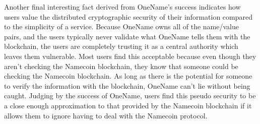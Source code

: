 Another final interesting fact derived from OneName's success indicates how users value the distributed cryptographic security of their information compared to the simplicity of a service. Because OneName owns all of the name/value pairs, and the users typically never validate what OneName tells them with the blockchain, the users are completely trusting it as a central authority which leaves them vulnerable. Most users find this acceptable because even though they aren't checking the Namecoin blockchain, they know that someone could be checking the Namecoin blockchain. As long as there is the potential for someone to verify the information with the blockchain, OneName can't lie without being caught. Judging by the success of OneName, users find this pseudo security to be a close enough approximation to that provided by the Namecoin blockchain if it allows them to ignore having to deal with the Namecoin protocol. 

